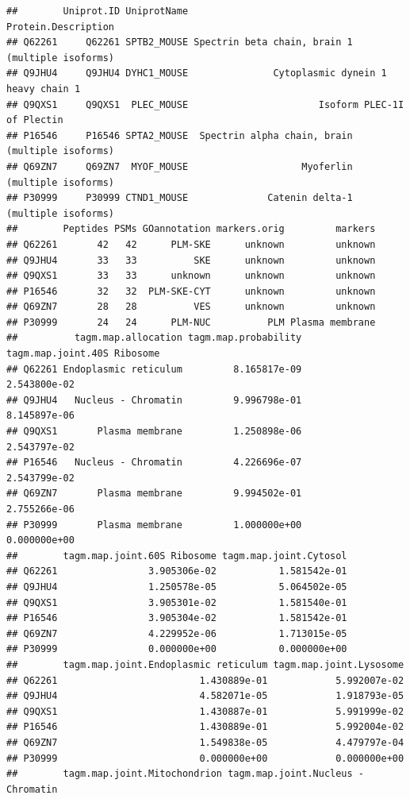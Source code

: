 \documentclass[
]{article}
\begin{document}
\begin{verbatim}
##        Uniprot.ID UniprotName                              Protein.Description
## Q62261     Q62261 SPTB2_MOUSE Spectrin beta chain, brain 1 (multiple isoforms)
## Q9JHU4     Q9JHU4 DYHC1_MOUSE               Cytoplasmic dynein 1 heavy chain 1
## Q9QXS1     Q9QXS1  PLEC_MOUSE                       Isoform PLEC-1I of Plectin
## P16546     P16546 SPTA2_MOUSE  Spectrin alpha chain, brain (multiple isoforms)
## Q69ZN7     Q69ZN7  MYOF_MOUSE                    Myoferlin (multiple isoforms)
## P30999     P30999 CTND1_MOUSE              Catenin delta-1 (multiple isoforms)
##        Peptides PSMs GOannotation markers.orig         markers
## Q62261       42   42      PLM-SKE      unknown         unknown
## Q9JHU4       33   33          SKE      unknown         unknown
## Q9QXS1       33   33      unknown      unknown         unknown
## P16546       32   32  PLM-SKE-CYT      unknown         unknown
## Q69ZN7       28   28          VES      unknown         unknown
## P30999       24   24      PLM-NUC          PLM Plasma membrane
##          tagm.map.allocation tagm.map.probability tagm.map.joint.40S Ribosome
## Q62261 Endoplasmic reticulum         8.165817e-09                2.543800e-02
## Q9JHU4   Nucleus - Chromatin         9.996798e-01                8.145897e-06
## Q9QXS1       Plasma membrane         1.250898e-06                2.543797e-02
## P16546   Nucleus - Chromatin         4.226696e-07                2.543799e-02
## Q69ZN7       Plasma membrane         9.994502e-01                2.755266e-06
## P30999       Plasma membrane         1.000000e+00                0.000000e+00
##        tagm.map.joint.60S Ribosome tagm.map.joint.Cytosol
## Q62261                3.905306e-02           1.581542e-01
## Q9JHU4                1.250578e-05           5.064502e-05
## Q9QXS1                3.905301e-02           1.581540e-01
## P16546                3.905304e-02           1.581542e-01
## Q69ZN7                4.229952e-06           1.713015e-05
## P30999                0.000000e+00           0.000000e+00
##        tagm.map.joint.Endoplasmic reticulum tagm.map.joint.Lysosome
## Q62261                         1.430889e-01            5.992007e-02
## Q9JHU4                         4.582071e-05            1.918793e-05
## Q9QXS1                         1.430887e-01            5.991999e-02
## P16546                         1.430889e-01            5.992004e-02
## Q69ZN7                         1.549838e-05            4.479797e-04
## P30999                         0.000000e+00            0.000000e+00
##        tagm.map.joint.Mitochondrion tagm.map.joint.Nucleus - Chromatin

\end{verbatim}
\end{document}
